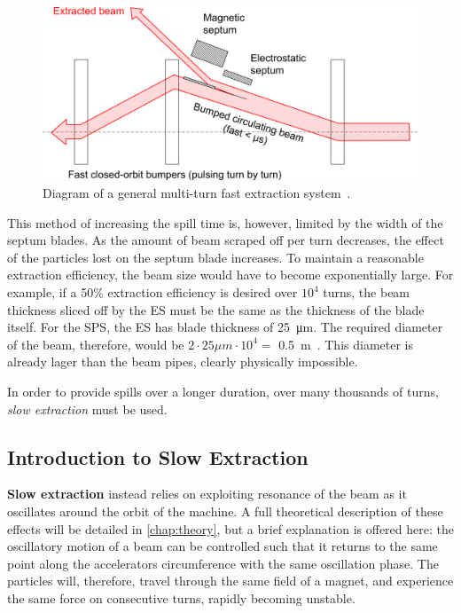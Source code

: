 \documentclass[11pt]{report}
\begin{document}
\begin{figure}[hb]
  \centering
  \includegraphics[width=\linewidth]{fastmulti.png}
  \caption{Diagram of a general multi-turn fast extraction system~\cite{Fraser:CAS}.}\label{fig:fast_multi_diagram}
\end{figure}

This method of increasing the spill time is, however, limited by the width of the septum blades. As the amount of beam scraped off per turn decreases, the effect of the particles lost on the septum blade increases. To maintain a reasonable extraction efficiency, the beam size would have to become exponentially large. For example, if a 50\% extraction efficiency is desired over $10^4$ turns, the beam thickness sliced off by the ES must be the same as the thickness of the blade itself. For the SPS, the ES has blade thickness of \qty{25}{\micro\meter}. The required diameter of the beam, therefore, would be $2\cdot 25\mu m\cdot 10^4 = $ \qty{0.5}{\meter}~\cite{brunner}. This diameter is already lager than the beam pipes, clearly physically impossible.

In order to provide spills over a longer duration, over many thousands of turns, \textit{slow extraction} must be used. 

\subsection{Introduction to Slow Extraction}

\textbf{Slow extraction} instead relies on exploiting resonance of the beam as it oscillates around the orbit of the machine. A full theoretical description of these effects will be detailed in \autoref{chap:theory}, but a brief explanation is offered here: the oscillatory motion of a beam can be controlled such that it returns to the same point along the accelerators circumference with the same oscillation phase. The particles will, therefore, travel through the same field of a magnet, and experience the same force on consecutive turns, rapidly becoming unstable.
\end{document}
